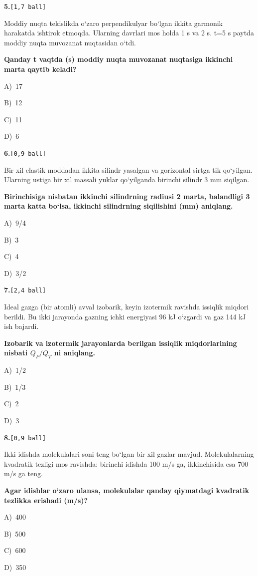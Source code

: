 \documentclass[11pt,a4paper]{article}
\newcommand{\ball}[1]{\hfill\texttt{[#1 ball]}}
\newcommand{\qhead}[2]{\Needspace{10\baselineskip}\noindent\textbf{#1.}\ball{#2}\par\nopagebreak}
\newcommand{\opt}[2]{\hspace*{8mm}#1)\ #2\par}
\newenvironment{qbody}{\begin{list}{}{\leftmargin=8mm\rightmargin=0pt\topsep=0pt\itemsep=0pt\parsep=3pt}\item\relax}{\end{list}}
\begin{document}
\noindent\begin{minipage}{\linewidth}
\qhead{5}{1,7}
\begin{qbody}
Moddiy nuqta tekislikda o‘zaro perpendikulyar bo‘lgan ikkita garmonik harakatda ishtirok etmoqda. Ularning davrlari mos holda 1 s va 2 s. t=5 s paytda moddiy nuqta muvozanat nuqtasidan o‘tdi.\par
\textbf{Qanday t vaqtda (s) moddiy nuqta muvozanat nuqtasiga ikkinchi marta qaytib keladi?}\par
\smallskip
\opt{A}{17}
\opt{B}{12}
\opt{C}{11}
\opt{D}{6}
\end{qbody}\end{minipage}\par\vspace{16pt}
\noindent\begin{minipage}{\linewidth}
\qhead{6}{0,9}
\begin{qbody}
Bir xil elastik moddadan ikkita silindr yasalgan va gorizontal sirtga tik qo‘yilgan. Ularning ustiga bir xil massali yuklar qo‘yilganda birinchi silindr 3 mm siqilgan.\par
\textbf{Birinchisiga nisbatan ikkinchi silindrning radiusi 2 marta, balandligi 3 marta katta bo‘lsa, ikkinchi silindrning siqilishini (mm) aniqlang.}\par
\smallskip
\opt{A}{9/4}
\opt{B}{3}
\opt{C}{4}
\opt{D}{3/2}
\end{qbody}\end{minipage}\par\vspace{16pt}
\noindent\begin{minipage}{\linewidth}
\qhead{7}{2,4}
\begin{qbody}
Ideal gazga (bir atomli) avval izobarik, keyin izotermik ravishda issiqlik miqdori berildi. Bu ikki jarayonda gazning ichki energiyasi 96 kJ o‘zgardi va gaz 144 kJ ish bajardi.\par
\textbf{Izobarik va izotermik jarayonlarda berilgan issiqlik miqdorlarining nisbati $Q_P/Q_T$ ni aniqlang.}\par
\smallskip
\opt{A}{1/2}
\opt{B}{1/3}
\opt{C}{2}
\opt{D}{3}
\end{qbody}\end{minipage}\par\vspace{16pt}
\noindent\begin{minipage}{\linewidth}
\qhead{8}{0,9}
\begin{qbody}
Ikki idishda molekulalari soni teng bo‘lgan bir xil gazlar mavjud. Molekulalarning kvadratik tezligi mos ravishda: birinchi idishda 100 m/s ga, ikkinchisida esa 700 m/s ga teng.\par
\textbf{Agar idishlar o‘zaro ulansa, molekulalar qanday qiymatdagi kvadratik tezlikka erishadi (m/s)?}\par
\smallskip
\opt{A}{400}
\opt{B}{500}
\opt{C}{600}
\opt{D}{350}
\end{qbody}\end{minipage}\par\vspace{16pt}
\end{document}
